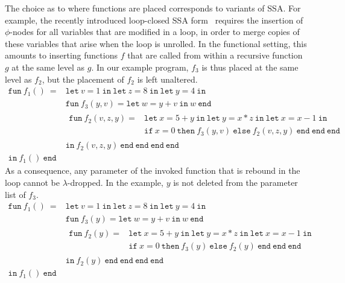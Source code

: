 The choice as to where functions are placed corresponds to variants of
SSA. For example, the recently introduced loop-closed SSA form~\cite{}
requires the insertion of $\phi$-nodes for all variables that are
modified in a loop, in order to merge copies of these variables that
arise when the loop is unrolled.  In the functional setting, this
amounts to inserting functions $f$ that are called from within a
recursive function $g$ at the same level as $g$. In our example
program, $f_3$ is thus placed at the same level as
$f_2$, but the placement of $f_2$ is left unaltered.
$$
\begin{array}{ll}
\mathtt{fun}\ f_1()\ = & \mathtt{let}\ v = 1 \ 
                  \mathtt{in\ let}\ z = 8 \ 
                  \mathtt{in\ let}\ y = 4\ \mathtt{in}\\
& \mathtt{fun}\ f_3(y,v) = 
   \mathtt{let}\ w = y+v\ \mathtt{in}\ w\ \mathtt{end}\\
&\! \begin{array}{ll}
     \mathtt{fun}\ f_2(v,z,y) = &
     \mathtt{let}\ x = 5+y\
     \mathtt{in\ let}\ y = x*z\
     \mathtt{in\ let}\ x = x-1\ \mathtt{in}\\
   & \mathtt{if}\ x=0\ \mathtt{then}\ f_3(y,v)\
     \mathtt{else}\ f_2(v,z,y)\ \mathtt{end\ end\ end}
  \end{array}\\
& \mathtt{in}\ f_2(v,z,y)\ \mathtt{end\ end\ end\ end}\\
\mathtt{in}\ f_1()\  \mathtt{end}
\end{array}
$$
As a consequence, any parameter of the invoked function that is
rebound in the loop cannot be $\lambda$-dropped. In the example,
$y$ is not deleted from the parameter list of $f_3$.
$$
\begin{array}{ll}
\mathtt{fun}\ f_1()\ = & \mathtt{let}\ v = 1 \ 
                  \mathtt{in\ let}\ z = 8 \ 
                  \mathtt{in\ let}\ y = 4\ \mathtt{in}\\
& \mathtt{fun}\ f_3(y) = 
   \mathtt{let}\ w = y+v\ \mathtt{in}\ w\ \mathtt{end}\\
&\! \begin{array}{ll}
     \mathtt{fun}\ f_2(y) = &
     \mathtt{let}\ x = 5+y\
     \mathtt{in\ let}\ y = x*z\
     \mathtt{in\ let}\ x = x-1\ \mathtt{in}\\
   & \mathtt{if}\ x=0\ \mathtt{then}\ f_3(y)\
     \mathtt{else}\ f_2(y)\ \mathtt{end\ end\ end}
  \end{array}\\
& \mathtt{in}\ f_2(y)\ \mathtt{end\ end\ end\ end}\\
\mathtt{in}\ f_1()\  \mathtt{end}
\end{array}
$$ 
